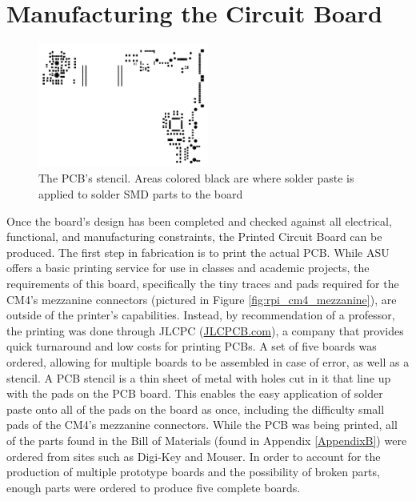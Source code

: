 \section{Manufacturing the Circuit Board}\label{sec:ManufacturingThePCB}

\begin{figure}[b]
  \centering
  \includegraphics[width=0.5\textwidth]{Figures/kicad/close-ups/stencil}
  \caption[PCB Stencil]{The PCB's stencil. Areas colored black are where solder paste is applied to solder SMD parts to the board}
  \label{fig:PCBStencil}
\end{figure}


Once the board's design has been completed and checked against all electrical, functional, and manufacturing constraints, the Printed Circuit Board can be produced.
The first step in fabrication is to print the actual PCB.
While ASU offers a basic printing service for use in classes and academic projects, the requirements of this board, specifically the tiny traces and pads required for the CM4's mezzanine connectors (pictured in Figure \ref{fig:rpi_cm4_mezzanine}), are outside of the printer's capabilities.
Instead, by recommendation of a professor, the printing was done through JLCPC (\href{https://www.jlcpc.com/}{JLCPCB.com}), a company that provides quick turnaround and low costs for printing PCBs.
A set of five boards was ordered, allowing for multiple boards to be assembled in case of error, as well as a stencil.
A PCB stencil is a thin sheet of metal with holes cut in it that line up with the pads on the PCB board.
This enables the easy application of solder paste onto all of the pads on the board as once, including the difficulty small pads of the CM4's mezzanine connectors.
While the PCB was being printed, all of the parts found in the Bill of Materials (found in Appendix \ref{AppendixB}) were ordered from sites such as Digi-Key and Mouser.
In order to account for the production of multiple prototype boards and the possibility of broken parts, enough parts were ordered to produce five complete boards.

